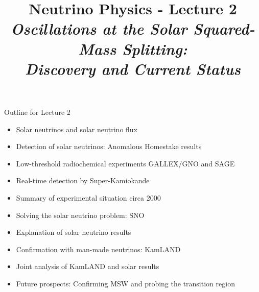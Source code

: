 \renewcommand{\thislecture}{2 }

%
%

\title[Neutrino Physics / Lecture \thislecture]
{
  {\huge \color{yellow} Neutrino Physics - Lecture \thislecture} \\
  {\it Oscillations at the Solar Squared-Mass Splitting:\\Discovery and Current Status}\\
}



\begin{frame}[plain]
  \titlepage
\end{frame}

%
%

\begin{frame}{Outline for Lecture \thislecture}

\begin{itemize}
  \item Solar neutrinos and solar neutrino flux
  \item Detection of solar neutrinos: Anomalous Homestake results
  \item Low-threshold radiochemical experiments GALLEX/GNO and SAGE
  \item Real-time detection by Super-Kamiokande
  \item Summary of experimental situation circa 2000
  \item Solving the solar neutrino problem: SNO
  \item Explanation of solar neutrino results
  \item Confirmation with man-made neutrinos: KamLAND
  \item Joint analysis of KamLAND and solar results
  \item Future prospects: Confirming MSW and probing the transition region
\end{itemize}

\end{frame}

%
%
%

